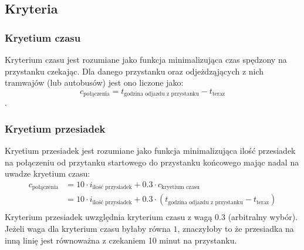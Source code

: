 \documentclass[12pt,a4paper]{article}
\begin{document}
    \subsection*{Kryteria}
    \subsubsection*{Kryetium czasu}
    Kryterium czasu jest rozumiane jako funkcja minimalizująca czas spędzony na przystanku czekając. Dla danego przystanku oraz odjeżdząjących z nich tramwajów (lub autobusów) jest ono liczone jako:$$c_{\text{połączenia}} = t_{\text{godzina odjazdu z przystanku}} - t_{\text{teraz}}$$.
    \subsubsection*{Kryetium przesiadek}
    Kryetium przesiadek jest rozumiane jako funkcja minimalizująca ilość przesiadek na połączeniu od przytanku startowego do przystanku końcowego mając nadal na uwadze kryetium czasu:
    \begin{align*}
        c_{\text{połączenia}}  &= 10 \cdot i_{\text{ilość przysiadek}} + 0.3 \cdot  c_{\text{kryetium czasu}}\\
        &= 10 \cdot i_{\text{ilość przysiadek}} + 0.3 \cdot  (t_{\text{godzina odjazdu z przystanku}} - t_{\text{teraz}})\\
    \end{align*}
    Kryterium przesiadek uwzględnia kryterium czasu z wagą $0.3$ (arbitralny wybór). Jeżeli waga dla kryterium czasu byłaby równa $1$, znaczyłoby to że przesiadka na inną linię jest równoważna z czekaniem 10 minut na przystanku.
\end{document}
